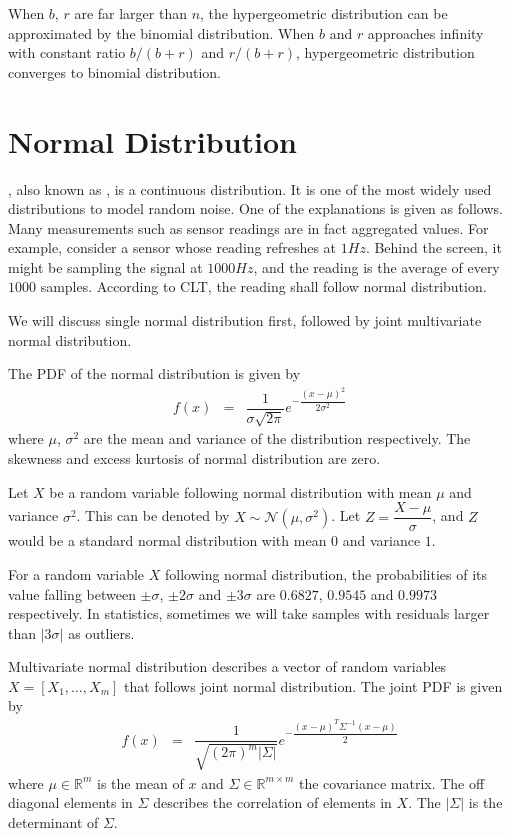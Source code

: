 When $b$, $r$ are far larger than $n$, the hypergeometric distribution can be approximated by the binomial distribution. When $b$ and $r$ approaches infinity with constant ratio $b/(b+r)$ and $r/(b+r)$, hypergeometric distribution converges to binomial distribution.

\section{Normal Distribution}

, also known as , is a continuous distribution. It is one of the most widely used distributions to model random noise. One of the explanations is given as follows. Many measurements such as sensor readings are in fact aggregated values. For example, consider a sensor whose reading refreshes at $1Hz$. Behind the screen, it might be sampling the signal at $1000Hz$, and the reading is the average of every $1000$ samples. According to CLT, the reading shall follow normal distribution.

We will discuss single normal distribution first, followed by joint multivariate normal distribution.

The PDF of the normal distribution is given by
\begin{eqnarray}
	f(x) &=& \dfrac{1}{\sigma\sqrt{2\pi}}e^{-\dfrac{(x-\mu)^2}{2\sigma^2}} \nonumber
\end{eqnarray}
where $\mu$, $\sigma^2$ are the mean and variance of the distribution respectively. The skewness and excess kurtosis of normal distribution are zero.

Let $X$ be a random variable following normal distribution with mean $\mu$ and variance $\sigma^2$. This can be denoted by $X\sim\mathcal{N}(\mu, \sigma^2)$. Let $Z=\dfrac{X-\mu}{\sigma}$, and $Z$ would be a standard normal distribution with mean $0$ and variance $1$.

For a random variable $X$ following normal distribution, the probabilities of its value falling between $\pm \sigma$, $\pm 2\sigma$ and $\pm 3\sigma$ are $0.6827$, $0.9545$ and $0.9973$ respectively. In statistics, sometimes we will take samples with residuals larger than $|3\sigma|$ as outliers.

Multivariate normal distribution describes a vector of random variables $X = \left[X_1, \ldots, X_m\right]$ that follows joint normal distribution. The joint PDF is given by
\begin{eqnarray}
	f(x) &=& \dfrac{1}{\sqrt{(2\pi)^m|\Sigma|}}e^{-\dfrac{(x-\mu)^T\Sigma^{-1}(x-\mu)}{2}} \nonumber
\end{eqnarray}
where $\mu \in \mathbb{R}^m$ is the mean of $x$ and $\Sigma \in \mathbb{R}^{m\times m}$ the covariance matrix. The off diagonal elements in $\Sigma$ describes the correlation of elements in $X$. The $|\Sigma|$ is the determinant of $\Sigma$.

